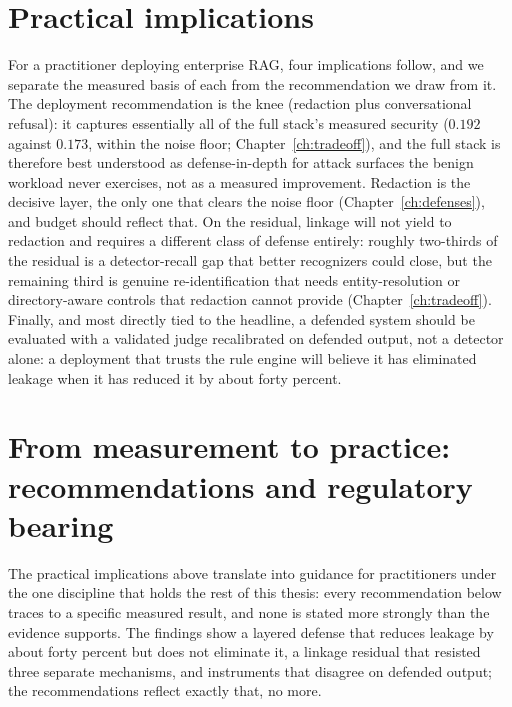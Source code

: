 \documentclass[12pt,a4paper]{report}
\begin{document}
\section{Practical implications}
\label{sec:disc-practical}

For a practitioner deploying enterprise RAG, four implications follow, and we separate the
measured basis of each from the recommendation we draw from it. The deployment recommendation is
the knee (redaction plus conversational refusal): it captures essentially all of the full
stack's measured security ($0.192$ against $0.173$, within the noise floor;
Chapter~\ref{ch:tradeoff}), and the full stack is therefore best understood as
defense-in-depth for attack surfaces the benign workload never exercises, not as a measured
improvement. Redaction is the decisive layer, the only one that clears the noise
floor (Chapter~\ref{ch:defenses}), and budget should reflect that. On the residual, linkage
will not yield to redaction and requires a different class of defense entirely:
roughly two-thirds of the residual is a detector-recall gap that better recognizers could close,
but the remaining third is genuine re-identification that needs entity-resolution or
directory-aware controls that redaction cannot provide (Chapter~\ref{ch:tradeoff}). Finally, and
most directly tied to the headline, a defended system should be evaluated with a
validated judge recalibrated on defended output, not a detector alone: a deployment that trusts
the rule engine will believe it has eliminated leakage when it has reduced it by about forty
percent.

\section{From measurement to practice: recommendations and regulatory bearing}
\label{sec:disc-recommendations}

The practical implications above translate into guidance for practitioners under the one discipline that
holds the rest of this thesis: every recommendation below traces to a specific measured result, and none
is stated more strongly than the evidence supports. The findings show a layered defense that reduces
leakage by about forty percent but does not eliminate it, a linkage residual that resisted three separate
mechanisms, and instruments that disagree on defended output; the recommendations reflect exactly
that, no more.
\end{document}
